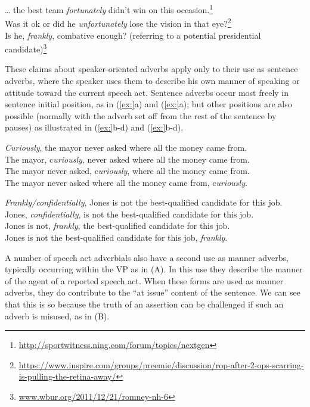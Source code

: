 \ea
\ea … the best team \textit{fortunately} didn’t win on this occasion.\footnote{\url{http://sportwitness.ning.com/forum/topics/nextgen}} \\
\ex Was it ok or did he \textit{unfortunately} lose the vision in that eye?\footnote{\url{https://www.inspire.com/groups/preemie/discussion/rop-after-2-ops-scarring-is-pulling-the-retina-away/}} \\
\ex Is he, \textit{frankly}, combative enough? (referring to a potential presidential candidate)\footnote{\href{http://www.wbur.org/2011/12/21/romney-nh-6}{{www.wbur.org/2011/12/21/romney-nh-6}}} 
                       \z
\z


These claims about speaker-oriented adverbs apply only to their use as sentence adverbs, where the speaker uses them to describe his own manner of speaking or attitude toward the current speech act. Sentence adverbs occur most freely in sentence initial position, as in (\ref{ex:}a) and (\ref{ex:}a); but other positions are also possible (normally with the adverb set off from the rest of the sentence by pauses) as illustrated in (\ref{ex:}b-d) and (\ref{ex:}b-d).


\ea
\ea \textit{Curiously}, the mayor never asked where all the money came from.\\
\ex The mayor, c\textit{uriously}, never asked where all the money came from.\\
\ex The mayor never asked, c\textit{uriously}, where all the money came from.\\
\ex The mayor never asked where all the money came from, c\textit{uriously}.
                       \z
\z

\ea
\ea \textit{Frankly/confidentially}, Jones is not the best-qualified candidate for this job.\\
\ex Jones, \textit{confidentially}, is not the best-qualified candidate for this job.\\
\ex Jones is not, \textit{frankly}, the best-qualified candidate for this job.\\
\ex Jones is not the best-qualified candidate for this job, \textit{frankly}.
                       \z
\z


A number of speech act adverbials also have a second use as manner adverbs, typically occurring within the VP as in (A). In this use they describe the manner of the agent of a reported speech act. When these forms are used as manner adverbs, they do contribute to the “at issue” content of the sentence. We can see that this is so because the truth of an assertion can be challenged if such an adverb is misused, as in (B).


